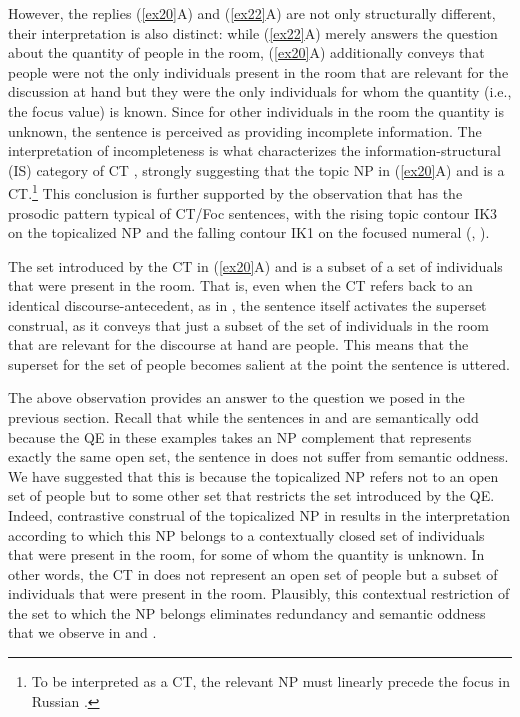 \documentclass[output=paper,
modfonts,
newtxmath,
hidelinks
]{langscibook}
\begin{document}
\largerpage[2]
\noindent However, the replies (\ref{ex20}A) and (\ref{ex22}A) are not only structurally different, their interpretation is also distinct: while (\ref{ex22}A) merely answers the question about the quantity of people in the room, (\ref{ex20}A) additionally conveys that people were not the only individuals present in the room that are relevant for the discussion at hand but they were the only individuals for whom the quantity (i.e., the focus value) is known. Since for other individuals in the room the quantity is unknown, the sentence is perceived as providing incomplete information. The interpretation of incompleteness is what characterizes the information-structural (IS) category of CT \citep{Büring2003}, strongly suggesting that the topic NP in (\ref{ex20}A) and  is a CT.\footnote{\label{fn18}To be interpreted as a CT, the relevant NP must linearly precede the focus in Russian \citep{Titov2013}.} This conclusion is further supported by the observation that  has the prosodic pattern typical of CT/Foc sentences, with the rising topic contour IK3 on the topicalized NP and the falling contour IK1 on the focused numeral (\citealt{Bryzgunova1971, Bryzgunova1981}, \citealt{Titov2013}).

The set introduced by the CT in (\ref{ex20}A) and  is a subset of a set of individuals that were present in the room. That is, even when the CT refers back to an identical discourse-antecedent, as in , the sentence itself activates the superset construal, as it conveys that just a subset of the set of individuals in the room that are relevant for the discourse at hand are people. This means that the superset for the set of people becomes salient at the point the sentence is uttered.

The above observation provides an answer to the question we posed in the previous section. Recall that while the sentences in  and  are semantically odd because the QE in these examples takes an NP complement that represents exactly the same open set, the sentence in  does not suffer from semantic oddness. We have suggested that this is because the topicalized NP refers not to an open set of people but to some other set that restricts the set introduced by the QE. Indeed, contrastive construal of the topicalized NP in  results in the interpretation according to which this NP belongs to a contextually closed set of individuals that were present in the room, for some of whom the quantity is unknown. In other words, the CT in  does not represent an open set of people but a subset of individuals that were present in the room. Plausibly, this contextual restriction of the set to which the NP belongs eliminates redundancy and semantic oddness that we observe in  and .
\end{document}
